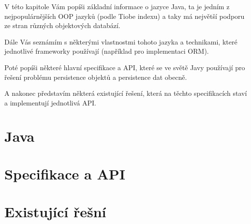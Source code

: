 V této kapitole Vám popíši základní informace o jazyce Java, ta je jedním z nejpopulárnějších OOP jazyků (podle Tiobe indexu) a taky má největší podporu ze stran různých objektových databází.

Dále Vás seznámím s některými vlastnostmi tohoto jazyka a technikami, které jednotlivé frameworky používají (například pro implementaci ORM).

Poté popíši některé hlavní specifikace a API, které se ve světě Javy používají pro řešení problému persistence objektů a persistence dat obecně. 

A nakonec představím některá existující řešení, která na těchto specifikacích staví a implementují jednotlivá API.
\section{Java}

\section{Specifikace a API}

\section{Existující řešní}

